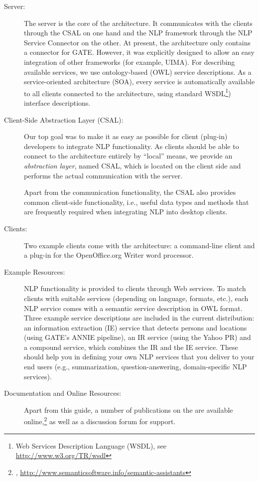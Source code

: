 \begin{description}
\item[Server:] The server is the core of the architecture.  It
  communicates with the clients through the CSAL on one hand and
  the NLP framework through the NLP Service Connector on the other.
  At present, the architecture only contains a connector for
  GATE. However, it was explicitly designed to allow an easy
  integration of other frameworks (for example, UIMA). For describing
  available services, we use ontology-based (OWL) service
  descriptions. As a service-oriented architecture (SOA), every
  service is automatically available to all clients connected to the
  architecture, using standard WSDL\footnote{Web Services Description
    Language (WSDL), see \url{http://www.w3.org/TR/wsdl}}) interface
  descriptions.

\item[Client-Side Abstraction Layer (CSAL):] Our top goal was to make
  it as easy as possible for client (plug-in) developers to integrate
  NLP functionality. As clients should be able to connect to the
  architecture entirely by ``local'' means, we provide an
  \emph{abstraction layer}, named CSAL, which is located on the client
  side and performs the actual communication with the server.

  Apart from the communication functionality, the CSAL also provides
  common client-side functionality, i.e., useful data types and
  methods that are frequently required when integrating NLP into
  desktop clients.

\item[Clients:] Two example clients come with the architecture: a
  command-line client and a plug-in for the OpenOffice.org Writer word
  processor. 

\item[Example Resources:] NLP functionality is provided to clients
  through Web services. To match clients with suitable services
  (depending on language, formats, etc.), each NLP service comes with
  a semantic service description in OWL format. Three example service
  descriptions are included in the current distribution: an
  information extraction (IE) service that detects persons and locations
  (using GATE's ANNIE pipeline), an IR service (using the Yahoo PR)
  and a compound service, which combines the IR and the IE
  service. These should help you in defining your own NLP services
  that you deliver to your end users (e.g., summarization,
  question-answering, domain-specific NLP services).

\item[Documentation and Online Resources:] Apart from this guide, a
  number of publications on the \sa are available
  online,\footnote{\sa,
    \url{http://www.semanticsoftware.info/semantic-assistants}} as
  well as a discussion forum for support.
\end{description}


